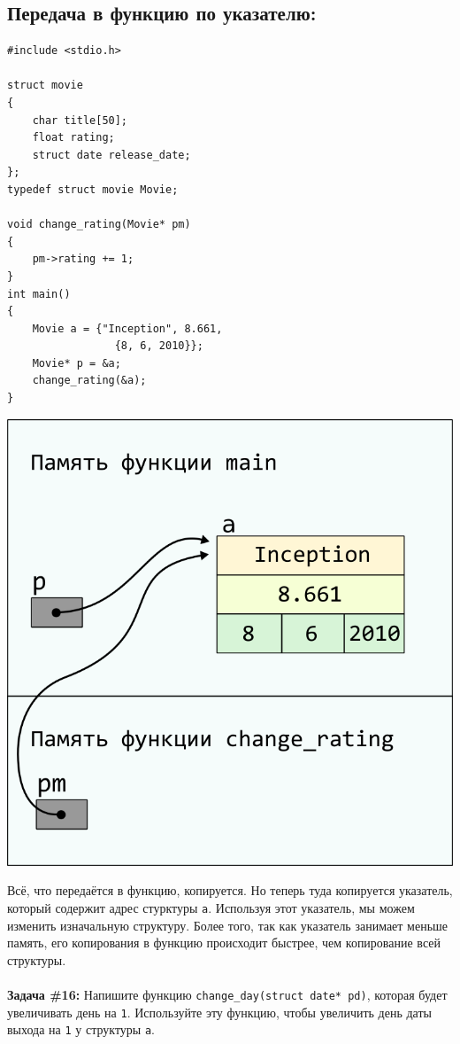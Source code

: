 \documentclass{article}
\begin{document}
\subsection*{Передача в функцию по указателю:}
\begin{multicols}{2}
\begin{lstlisting}
#include <stdio.h>

struct movie
{
	char title[50];
	float rating;
	struct date release_date;
};
typedef struct movie Movie;

void change_rating(Movie* pm)
{
	pm->rating += 1;
}
int main()
{
	Movie a = {"Inception", 8.661, 
	             {8, 6, 2010}};
	Movie* p = &a;
	change_rating(&a);
}
\end{lstlisting}
\columnbreak
\begin{center}
\includegraphics[scale=1]{../../images/pointer_schemes/function_by_pointer.png}
\end{center}
\end{multicols}
Всё, что передаётся в функцию, копируется. Но теперь туда копируется указатель, который содержит
адрес стурктуры \texttt{a}. Используя этот указатель, мы можем изменить изначальную структуру. Более того, так как указатель занимает меньше память, его копирования в функцию происходит быстрее, чем копирование всей структуры.\\\\
\textbf{Задача \#16:} Напишите функцию \texttt{change\_day(struct date* pd)}, которая будет увеличивать день на \texttt{1}. Используйте эту функцию, чтобы увеличить день даты выхода на \texttt{1} у структуры \texttt{a}.\\
\newpage
\end{document}
